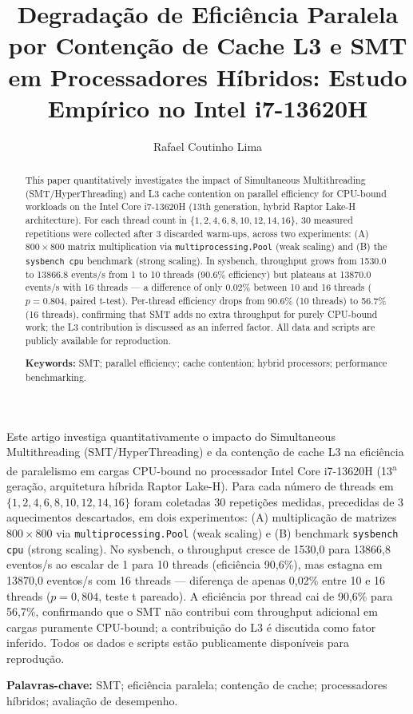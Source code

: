 \documentclass[12pt]{article}
\title{Degradação de Eficiência Paralela por Contenção de Cache L3 e
SMT em Processadores Híbridos: Estudo Empírico no Intel i7-13620H}
\author{Rafael Coutinho Lima\inst{1}}
\begin{document}
\maketitle

\begin{abstract}
  This paper quantitatively investigates the impact of Simultaneous
  Multithreading (SMT/HyperThreading) and L3 cache contention on parallel
  efficiency for CPU-bound workloads on the Intel Core i7-13620H (13th
  generation, hybrid Raptor Lake-H architecture). For each thread count in
  $\{1, 2, 4, 6, 8, 10, 12, 14, 16\}$, 30 measured repetitions were collected
  after 3 discarded warm-ups, across two experiments: (A) $800 \times 800$
  matrix multiplication via \texttt{multiprocessing.Pool} (weak scaling) and
  (B) the \texttt{sysbench cpu} benchmark (strong scaling). In sysbench,
  throughput grows from 1530.0 to 13866.8 events/s from 1 to 10 threads
  (90.6\% efficiency) but plateaus at 13870.0 events/s with 16 threads --- a
  difference of only 0.02\% between 10 and 16 threads ($p = 0.804$, paired
  t-test). Per-thread efficiency drops from 90.6\% (10 threads) to 56.7\%
  (16 threads), confirming that SMT adds no extra throughput for purely
  CPU-bound work; the L3 contribution is discussed as an inferred factor. All
  data and scripts are publicly available for reproduction.

  \noindent\textbf{Keywords:} SMT; parallel efficiency; cache contention;
  hybrid processors; performance benchmarking.
\end{abstract}

\begin{resumo}
  Este artigo investiga quantitativamente o impacto do Simultaneous
  Multithreading (SMT/HyperThreading) e da contenção de cache L3 na eficiência
  de paralelismo em cargas CPU-bound no processador Intel Core i7-13620H
  (13\textsuperscript{a} geração, arquitetura híbrida Raptor Lake-H). Para cada
  número de threads em $\{1, 2, 4, 6, 8, 10, 12, 14, 16\}$ foram coletadas 30
  repetições medidas, precedidas de 3 aquecimentos descartados, em dois
  experimentos: (A) multiplicação de matrizes $800 \times 800$ via
  \texttt{multiprocessing.Pool} (weak scaling) e (B) benchmark
  \texttt{sysbench cpu} (strong scaling). No sysbench, o throughput cresce de
  1530,0 para 13866,8 eventos/s ao escalar de 1 para 10 threads (eficiência
  90,6\%), mas estagna em 13870,0 eventos/s com 16 threads --- diferença de
  apenas 0,02\% entre 10 e 16 threads ($p = 0{,}804$, teste t pareado). A
  eficiência por thread cai de 90,6\% para 56,7\%, confirmando que o SMT não
  contribui com throughput adicional em cargas puramente CPU-bound; a
  contribuição do L3 é discutida como fator inferido. Todos os dados e scripts
  estão publicamente disponíveis para reprodução.

  \noindent\textbf{Palavras-chave:} SMT; eficiência paralela; contenção de
  cache; processadores híbridos; avaliação de desempenho.
\end{resumo}
\end{document}
